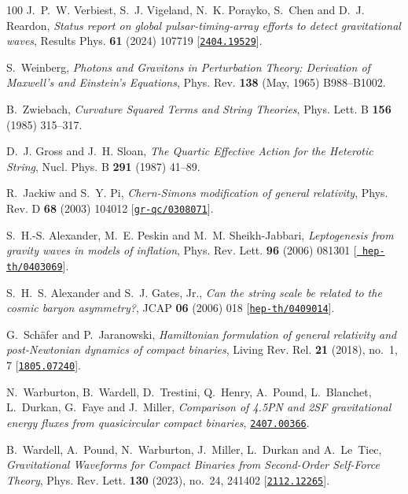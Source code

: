 \begin{thebibliography}{100}
J.~P.~W. Verbiest, S.~J. Vigeland, N.~K. Porayko, S.~Chen and D.~J. Reardon,
  {\em {Status report on global pulsar-timing-array efforts to detect
  gravitational waves}}, Results Phys. {\bf 61} (2024) 107719
  [\href{http://www.arXiv.org/abs/2404.19529}{{\tt 2404.19529}}].

S.~Weinberg,  {\em Photons and Gravitons in Perturbation Theory: Derivation of
  Maxwell's and Einstein's Equations}, Phys. Rev. {\bf 138} (May, 1965)
  B988--B1002.

B.~Zwiebach,  {\em {Curvature Squared Terms and String Theories}}, Phys. Lett.
  B {\bf 156} (1985) 315--317.

D.~J. Gross and J.~H. Sloan,  {\em {The Quartic Effective Action for the
  Heterotic String}}, Nucl. Phys. B {\bf 291} (1987) 41--89.

R.~Jackiw and S.~Y. Pi,  {\em {Chern-Simons modification of general
  relativity}}, Phys. Rev. D {\bf 68} (2003) 104012
  [\href{http://www.arXiv.org/abs/gr-qc/0308071}{{\tt gr-qc/0308071}}].

S.~H.-S. Alexander, M.~E. Peskin and M.~M. Sheikh-Jabbari,  {\em {Leptogenesis
  from gravity waves in models of inflation}}, Phys. Rev. Lett. {\bf 96} (2006)
  081301 [\href{http://www.arXiv.org/abs/hep-th/0403069}{{\tt
  hep-th/0403069}}].

S.~H.~S. Alexander and S.~J. Gates, Jr.,  {\em {Can the string scale be related
  to the cosmic baryon asymmetry?}}, JCAP {\bf 06} (2006) 018
  [\href{http://www.arXiv.org/abs/hep-th/0409014}{{\tt hep-th/0409014}}].

G.~Sch\"afer and P.~Jaranowski,  {\em {Hamiltonian formulation of general
  relativity and post-Newtonian dynamics of compact binaries}}, Living Rev.
  Rel. {\bf 21} (2018), no.~1, 7
  [\href{http://www.arXiv.org/abs/1805.07240}{{\tt 1805.07240}}].

N.~Warburton, B.~Wardell, D.~Trestini, Q.~Henry, A.~Pound, L.~Blanchet,
  L.~Durkan, G.~Faye and J.~Miller,  {\em {Comparison of 4.5PN and 2SF
  gravitational energy fluxes from quasicircular compact binaries}},
  \href{http://www.arXiv.org/abs/2407.00366}{{\tt 2407.00366}}.

B.~Wardell, A.~Pound, N.~Warburton, J.~Miller, L.~Durkan and A.~Le~Tiec,  {\em
  {Gravitational Waveforms for Compact Binaries from Second-Order Self-Force
  Theory}}, Phys. Rev. Lett. {\bf 130} (2023), no.~24, 241402
  [\href{http://www.arXiv.org/abs/2112.12265}{{\tt 2112.12265}}].


\end{thebibliography}
